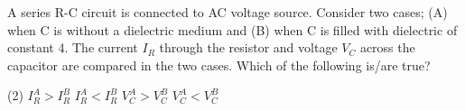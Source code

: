 
\item A series R-C circuit is connected to AC voltage source. Consider two cases; (A) when C is without a dielectric medium and (B) when C is filled with dielectric of constant 4. The current $I_R$ through the resistor and voltage $V_C$ across the capacitor are compared in the two cases. Which of the following is/are true?
    \begin{tasks}(2)
        \task $I^A_R > I^B_R$
        \task $I^A_R < I^B_R$
        \task $V^A_C > V^B_C$
        \task $V^A_C < V^B_C$
    \end{tasks}
